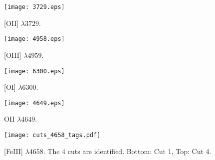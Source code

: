 \documentclass[fleqn,usenatbib]{mnras}
\begin{document}
\begin{figure*}
  \begin{subfigure}{6cm}
    \centering\texttt{[image: 3729.eps]}
    \caption{[O\thinspace II] $\lambda 3729$.}
  \end{subfigure}
  \begin{subfigure}{6cm}
    \centering\texttt{[image: 4958.eps]}
    \caption{[O\thinspace III] $\lambda 4959$.}
  \end{subfigure}
 
  \begin{subfigure}{6cm}
    \centering\texttt{[image: 6300.eps]}
    \caption{[O\thinspace I] $\lambda 6300$.}
  \end{subfigure}
  \begin{subfigure}{6cm}
    \centering\texttt{[image: 4649.eps]}
    \caption{O\thinspace II $\lambda 4649$.}
  \end{subfigure}
\begin{subfigure}{10cm}
\centering\texttt{[image: cuts\_4658\_tags.pdf]}
\caption{[Fe\thinspace III] $\lambda 4658$. The 4 cuts are identified. Bottom: Cut 1, Top: Cut 4.} 
\end{subfigure}
\caption{\textit{Upper panels:} Sample of representative lines in the bi-dimensional spectrum. The Y axis corresponds to the spatial direction (up east, down west, see Fig.\ref{fig:hst} for the spatial location of the slit) while the X axis is the spectral axis. All figures are centered at $\lambda_0$, the rest-frame reference wavelength of each line. The ``ball-shaped'' emission corresponds to HH~529~II while the elongated one to HH~529~III. The blueshifted high-velocity components do not present emission from neutral elements as [O\thinspace I] and rather faint emission from low ionization ions such as [O\thinspace II]. \textit{Bottom panel:} Emission of the [Fe\thinspace III] $\lambda 4658.17$ line as well as the limits and extension of the different spatial cuts selected to analyse each velocity component. Cut 1 is at the bottom, which corresponds to the westernmost one. 
The spatial coverage is 1.23 arcsec, 4.43 arcsec, 2.46 arcsec and 1.23 arcsec for cuts 1, 2, 3 and 4, respectively.
The velocity scale is heliocentric.}
\label{fig:cuts}
\end{figure*}
\end{document}
